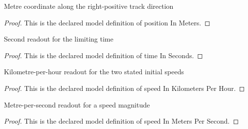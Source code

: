 \begin{definition}
  \label{def:physics:phyx-mini-0730:phyxminiproblems-problemphyxmini0730-positioninmeters}
  Metre coordinate along the right-positive track direction
\end{definition}
\begin{proof}
  This is the declared model definition of position In Meters.
\end{proof}
\begin{definition}
  \label{def:physics:phyx-mini-0730:phyxminiproblems-problemphyxmini0730-timeinseconds}
  Second readout for the limiting time
\end{definition}
\begin{proof}
  This is the declared model definition of time In Seconds.
\end{proof}
\begin{definition}
  \label{def:physics:phyx-mini-0730:phyxminiproblems-problemphyxmini0730-speedinkilometersperhour}
  Kilometre-per-hour readout for the two stated initial speeds
\end{definition}
\begin{proof}
  This is the declared model definition of speed In Kilometers Per Hour.
\end{proof}
\begin{definition}
  \label{def:physics:phyx-mini-0730:phyxminiproblems-problemphyxmini0730-speedinmeterspersecond}
  Metre-per-second readout for a speed magnitude
\end{definition}
\begin{proof}
  This is the declared model definition of speed In Meters Per Second.
\end{proof}
